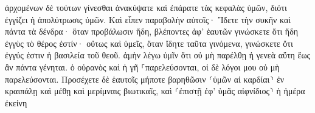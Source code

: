 \documentclass{openreader}
\begin{document}
ἀρχομένων δὲ τούτων γίνεσθαι ἀνακύψατε καὶ ἐπάρατε τὰς κεφαλὰς ὑμῶν, διότι ἐγγίζει ἡ ἀπολύτρωσις ὑμῶν. 
Καὶ εἶπεν παραβολὴν αὐτοῖς· Ἴδετε τὴν συκῆν καὶ πάντα τὰ δένδρα· 
ὅταν προβάλωσιν ἤδη, βλέποντες ἀφ’ ἑαυτῶν γινώσκετε ὅτι ἤδη ἐγγὺς τὸ θέρος ἐστίν· 
οὕτως καὶ ὑμεῖς, ὅταν ἴδητε ταῦτα γινόμενα, γινώσκετε ὅτι ἐγγύς ἐστιν ἡ βασιλεία τοῦ θεοῦ. 
ἀμὴν λέγω ὑμῖν ὅτι οὐ μὴ παρέλθῃ ἡ γενεὰ αὕτη ἕως ἂν πάντα γένηται. 
ὁ οὐρανὸς καὶ ἡ γῆ ⸀παρελεύσονται, οἱ δὲ λόγοι μου οὐ μὴ παρελεύσονται. 
Προσέχετε δὲ ἑαυτοῖς μήποτε βαρηθῶσιν ⸂ὑμῶν αἱ καρδίαι⸃ ἐν κραιπάλῃ καὶ μέθῃ καὶ μερίμναις βιωτικαῖς, καὶ ⸂ἐπιστῇ ἐφ’ ὑμᾶς αἰφνίδιος⸃ ἡ ἡμέρα ἐκείνη 
\end{document}
